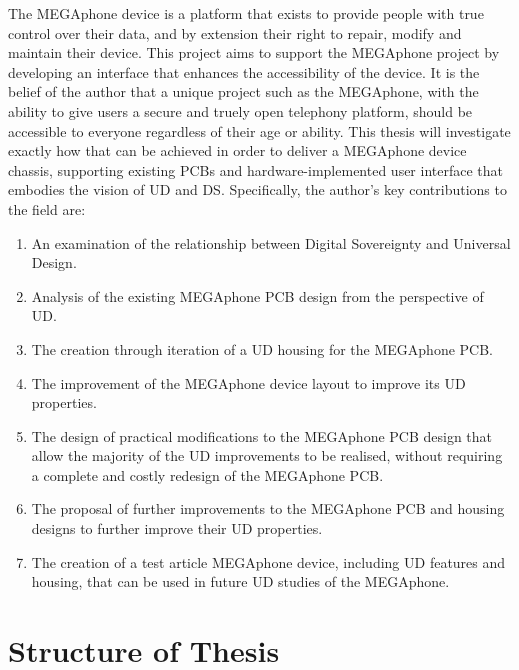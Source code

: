 The MEGAphone device is a platform that exists to provide people with true control over their data, and by extension their right to repair, modify and maintain their device.
This project aims to support the MEGAphone project by developing an interface that enhances the accessibility of the device.
It is the belief of the author that a unique project such as the MEGAphone, with the ability to give users a secure and truely open telephony platform, should be accessible to everyone regardless of their age or ability.
This thesis will investigate exactly how that can be achieved in order to deliver a MEGAphone device chassis, supporting existing PCBs and hardware-implemented user interface that embodies the vision of UD and DS.\vspace{5mm} %
\newline
Specifically, the author's key contributions to the field are:
\begin{enumerate}
    \item An examination of the relationship between Digital Sovereignty and Universal Design.
    \item Analysis of the existing MEGAphone PCB design from the perspective of UD.
    \item The creation through iteration of a UD housing for the MEGAphone PCB.
    \item The improvement of the MEGAphone device layout to improve its UD properties.
    \item The design of practical modifications to the MEGAphone PCB design that allow the majority of the UD improvements to be realised, without requiring a complete and costly redesign of the MEGAphone PCB.
    \item The proposal of further improvements to the MEGAphone PCB and housing designs to further improve their UD properties.
    \item The creation of a test article MEGAphone device, including UD features and housing, that can be used in future UD studies of the MEGAphone.
\end{enumerate}

\section{Structure of Thesis}

